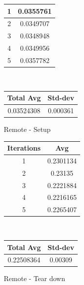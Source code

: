 \begin{enumerate}
\begin{center}
\begin{tabular}{||c c||}
             1 & 0.0355761  \\ 
             \hline
             2 & 0.0349707  \\ 
             \hline
             3 & 0.0348948  \\ 
             \hline
             4 & 0.0349956 \\ 
             \hline
             5 & 0.0357782  \\ 
             \hline
             \hline
            \end{tabular} \\
            \begin{tabular}{||c c||} 
             \hline
             Total Avg & Std-dev \\ [0.5ex] 
             \hline\hline
             0.03524308 & 0.000361 \\ 
             \hline
             \hline
            \end{tabular}
        \end{center}
    \item [Remote - Setup]
        \begin{center}
            \begin{tabular}{||c c||} 
                 \hline
                 Iterations & Avg \\ [0.5ex] 
                 \hline\hline
                 1 & 0.2301134  \\ 
                 \hline
                 2 & 0.23135  \\ 
                 \hline
                 3 & 0.2221884  \\ 
                 \hline
                 4 & 0.2216165 \\ 
                 \hline
                 5 & 0.2265407   \\ 
                 \hline
                 \hline
                \end{tabular} \\
                \begin{tabular}{||c c||} 
                 \hline
                 Total Avg & Std-dev \\ [0.5ex] 
                 \hline\hline
                 0.22508364 & 0.00309 \\ 
                 \hline
                \hline
            \end{tabular}
        \end{center}
    \item [Remote - Tear down]
        \begin{center}

\end{center}
\end{enumerate}
